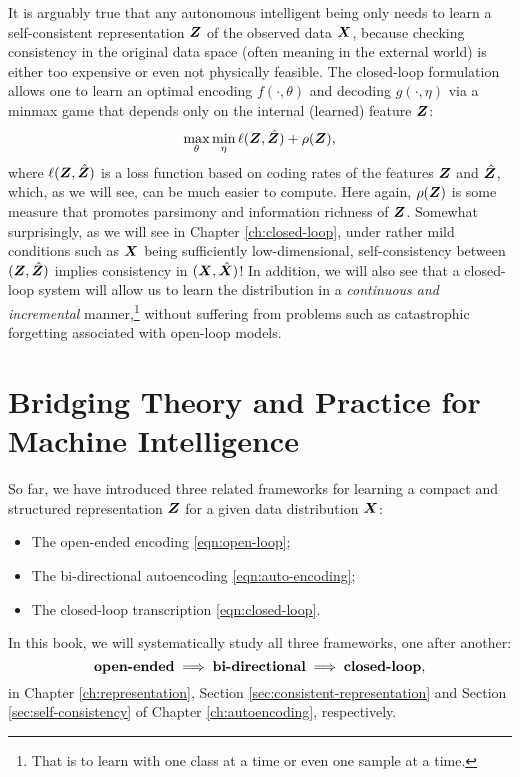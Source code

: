 \documentclass[../../book-main.tex]{subfiles}
\begin{document}
It is arguably true that any  autonomous intelligent being only needs to learn a self-consistent representation $\bm{Z}$ of the observed data $\bm{X}$, because checking consistency in the original data space (often meaning in the external world) is either too expensive or even not physically feasible. The closed-loop formulation allows one to learn an optimal encoding $f(\cdot, \theta)$ and decoding $g(\cdot, \eta)$ via a minmax game that depends only on the internal (learned) feature $\bm{Z}$:
\begin{equation}
\max_{\theta}\min_{\eta} \ell( \bm{Z}, \hat {\bm{Z}}) + \rho(\bm{Z}), 
   \label{eqn:closed-loop-objective}
\end{equation}
where $\ell( \bm{Z}, \hat {\bm{Z}})$ is a loss function based on coding rates of the features $\bm{Z}$ and $\hat {\bm{Z}}$, which, as we will see, can be much easier to compute. Here again, $\rho(\bm{Z})$ is some measure that promotes parsimony and information richness of $\bm{Z}$. Somewhat surprisingly, as we will see in Chapter \ref{ch:closed-loop}, under rather mild conditions such as $\bm{X}$ being sufficiently low-dimensional, self-consistency between $(\bm{Z}, \hat {\bm{Z}})$ implies consistency in $(\bm{X}, \hat {\bm{X}})$! In addition, we will also see that a closed-loop system will allow us to learn the distribution in a {\em continuous and incremental} manner,\footnote{That is to learn with one class at a time or even one sample at a time.} without suffering from problems such as catastrophic forgetting associated with open-loop models. 

\section{Bridging Theory and Practice for Machine Intelligence}
So far, we have introduced three related  frameworks for learning a compact and structured representation $\bm{Z}$ for a given data distribution $\bm{X}$: 
\begin{itemize}
\item The open-ended encoding \eqref{eqn:open-loop};
\item The bi-directional autoencoding \eqref{eqn:auto-encoding};
\item The closed-loop transcription \eqref{eqn:closed-loop}.
\end{itemize}
In this book, we will systematically study all three frameworks, one after another:
\begin{equation}
    \mbox{\textbf{open-ended}} \; \Longrightarrow \; 
    \mbox{\textbf{bi-directional}} \;  \Longrightarrow \; \mbox{\textbf{closed-loop}},
\end{equation}
in Chapter \ref{ch:representation}, Section \ref{sec:consistent-representation} and Section \ref{sec:self-consistency} of Chapter \ref{ch:autoencoding}, respectively.
\end{document}

